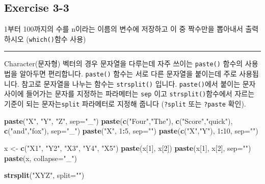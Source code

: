 \documentclass[
]{book}
\newenvironment{Shaded}{\begin{snugshade}}{\end{snugshade}}
\newcommand{\DataTypeTok}[1]{\textcolor[rgb]{0.13,0.29,0.53}{#1}}
\newcommand{\DecValTok}[1]{\textcolor[rgb]{0.00,0.00,0.81}{#1}}
\newcommand{\KeywordTok}[1]{\textcolor[rgb]{0.13,0.29,0.53}{\textbf{#1}}}
\newcommand{\NormalTok}[1]{#1}
\newcommand{\OperatorTok}[1]{\textcolor[rgb]{0.81,0.36,0.00}{\textbf{#1}}}
\newcommand{\StringTok}[1]{\textcolor[rgb]{0.31,0.60,0.02}{#1}}
\begin{document}
\hypertarget{exercise-3-3}{%
\subsection{Exercise 3-3}\label{exercise-3-3}}

1부터 100까지의 수를 n이라는 이름의 변수에 저장하고 이 중 짝수만을 뽑아내서 출력하시오 (\texttt{which()}함수 사용)

\begin{center}\rule{0.5\linewidth}{0.5pt}\end{center}

Character(문자형) 벡터의 경우 문자열을 다루는데 자주 쓰이는 \texttt{paste()} 함수의 사용법을 알아두면 편리합니다. \texttt{paste()} 함수는 서로 다른 문자열을 붙이는데 주로 사용됩니다. 참고로 문자열을 나누는 함수는 \texttt{strsplit()} 입니다. \texttt{paste()}에서 붙이는 문자 사이에 들어가는 문자를 지정하는 파라메터는 \texttt{sep} 이고 \texttt{strsplit()}함수에서 자르는 기준이 되는 문자는\texttt{split} 파라메터로 지정해 줍니다 (\texttt{?split} 또는 \texttt{?paste} 확인).

\begin{Shaded}
\begin{Highlighting}[]
\KeywordTok{paste}\NormalTok{(}\StringTok{"X"}\NormalTok{, }\StringTok{"Y"}\NormalTok{, }\StringTok{"Z"}\NormalTok{, }\DataTypeTok{sep=}\StringTok{"\_"}\NormalTok{)}
\KeywordTok{paste}\NormalTok{(}\KeywordTok{c}\NormalTok{(}\StringTok{"Four"}\NormalTok{,}\StringTok{"The"}\NormalTok{), }\KeywordTok{c}\NormalTok{(}\StringTok{"Score"}\NormalTok{,}\StringTok{"quick"}\NormalTok{), }\KeywordTok{c}\NormalTok{(}\StringTok{"and"}\NormalTok{,}\StringTok{"fox"}\NormalTok{), }\DataTypeTok{sep=}\StringTok{"\_"}\NormalTok{)}
\KeywordTok{paste}\NormalTok{(}\StringTok{"X"}\NormalTok{, }\DecValTok{1}\OperatorTok{:}\DecValTok{5}\NormalTok{, }\DataTypeTok{sep=}\StringTok{""}\NormalTok{)}
\KeywordTok{paste}\NormalTok{(}\KeywordTok{c}\NormalTok{(}\StringTok{"X"}\NormalTok{,}\StringTok{"Y"}\NormalTok{), }\DecValTok{1}\OperatorTok{:}\DecValTok{10}\NormalTok{, }\DataTypeTok{sep=}\StringTok{""}\NormalTok{)}

\NormalTok{x <{-}}\StringTok{ }\KeywordTok{c}\NormalTok{(}\StringTok{"X1"}\NormalTok{, }\StringTok{"Y2"}\NormalTok{, }\StringTok{"X3"}\NormalTok{, }\StringTok{"Y4"}\NormalTok{, }\StringTok{"X5"}\NormalTok{)}
\KeywordTok{paste}\NormalTok{(x[}\DecValTok{1}\NormalTok{], x[}\DecValTok{2}\NormalTok{])}
\KeywordTok{paste}\NormalTok{(x[}\DecValTok{1}\NormalTok{], x[}\DecValTok{2}\NormalTok{], }\DataTypeTok{sep=}\StringTok{""}\NormalTok{)}
\KeywordTok{paste}\NormalTok{(x, }\DataTypeTok{collapse=}\StringTok{"\_"}\NormalTok{)}

\KeywordTok{strsplit}\NormalTok{(}\StringTok{"XYZ"}\NormalTok{, }\DataTypeTok{split=}\StringTok{""}\NormalTok{)}
\end{Highlighting}
\end{Shaded}
\end{document}
